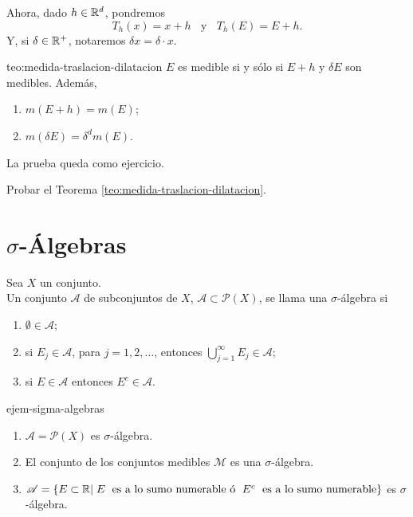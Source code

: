 Ahora, dado $h\in \mathbb{R}^d$, pondremos
\[
T_h(x)=x+h\;\;\mbox{ y }\;\; T_h(E)=E+h.
\]
Y, si $\delta \in \mathbb{R}^+$, notaremos $\delta x=\delta \cdot x$.

\begin{teorema}{teo:medida-traslacion-dilatacion}
$E$ es medible si y s\'olo si $E+h$  y $\delta E$ son medibles.
Adem\'as, 
\begin{enumerate}
    \item $m(E+h)=m(E)$;
    \item $m(\delta E)=\delta^d m(E)$.
\end{enumerate}
\end{teorema}

\begin{demo}
La prueba queda como ejercicio.
\end{demo}

\begin{ejercicio}{}
Probar el Teorema \ref{teo:medida-traslacion-dilatacion}.
\end{ejercicio}

\section{$\sigma$-\'Algebras}

\begin{definicion}{}
Sea $X$ un conjunto. 
\\
Un conjunto $\mathscr{A}$ de subconjuntos de $X$, 
$\mathscr{A}\subset \mathscr{P}(X)$, se llama una $\sigma$-\'algebra si \begin{enumerate}
    \item $\emptyset \in \mathscr{A}$;
    \item si $E_j\in \mathscr{A}$, para $j=1,2,\ldots$, entonces
    $\bigcup\limits_{j=1}^{\infty} E_j \in \mathscr{A}$;
    \item si $E\in \mathscr{A}$ entonces $E^c \in \mathscr{A}$.
\end{enumerate}
\end{definicion}


\begin{ejemplo}{ejem-sigma-algebras}
\begin{enumerate}
    \item $\mathscr{A}=\mathscr{P}(X)$ es $\sigma$-\'algebra.
    \item El conjunto de los conjuntos medibles $\mathscr{M}$ es una $\sigma$-\'algebra.
    \item\label{it:sigma-algebra-cjto-a-lo-s-numerable} $\mathscr{A}=\left\{E\subset \mathbb{R}| \;E \;\mbox{ es a lo sumo numerable \'o } \; E^c \;\mbox{ es a lo sumo numerable}  \right\}$
    es $\sigma$-\'algebra.
\end{enumerate}
\end{ejemplo}


